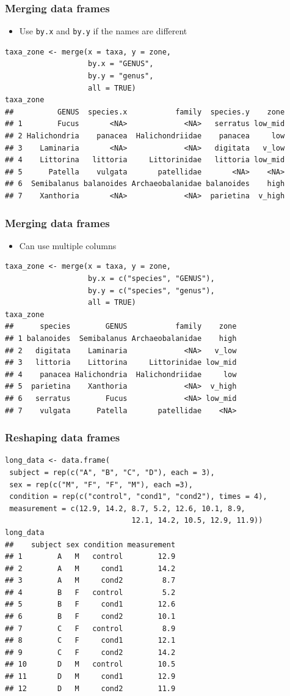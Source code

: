 \documentclass{beamer}
\newcommand{\lsting}[1]{\begin{lstlisting}[basicstyle=#1]}
\newcommand{\bi}{\begin{itemize}}
\newcommand{\li}{\item}
\newcommand{\ei}{\end{itemize}}
\newcommand{\bfr}[1]{\begin{frame}[fragile]\frametitle{{ #1 }}}
\begin{document}
\bfr{Merging data frames}
\bi
\li Use \verb|by.x| and \verb|by.y| if the names are different
\ei
\lsting{\tiny}
taxa_zone <- merge(x = taxa, y = zone, 
                   by.x = "GENUS", 
                   by.y = "genus",
                   all = TRUE)
taxa_zone
##          GENUS  species.x           family  species.y    zone
## 1        Fucus       <NA>             <NA>   serratus low_mid
## 2 Halichondria    panacea  Halichondriidae    panacea     low
## 3    Laminaria       <NA>             <NA>   digitata   v_low
## 4    Littorina   littoria     Littorinidae   littoria low_mid
## 5      Patella    vulgata       patellidae       <NA>    <NA>
## 6  Semibalanus balanoides Archaeobalanidae balanoides    high
## 7    Xanthoria       <NA>             <NA>  parietina  v_high
\end{lstlisting}

\end{frame}

\bfr{Merging data frames}
\bi
\li Can use multiple columns
\ei
\lsting{\tiny}
taxa_zone <- merge(x = taxa, y = zone, 
                   by.x = c("species", "GENUS"), 
                   by.y = c("species", "genus"), 
                   all = TRUE)
taxa_zone
##      species        GENUS           family    zone
## 1 balanoides  Semibalanus Archaeobalanidae    high
## 2   digitata    Laminaria             <NA>   v_low
## 3   littoria    Littorina     Littorinidae low_mid
## 4    panacea Halichondria  Halichondriidae     low
## 5  parietina    Xanthoria             <NA>  v_high
## 6   serratus        Fucus             <NA> low_mid
## 7    vulgata      Patella       patellidae    <NA>
\end{lstlisting}

\end{frame}

\bfr{Reshaping data frames}
\lsting{\scriptsize}
long_data <- data.frame(
 subject = rep(c("A", "B", "C", "D"), each = 3),
 sex = rep(c("M", "F", "F", "M"), each =3),
 condition = rep(c("control", "cond1", "cond2"), times = 4),
 measurement = c(12.9, 14.2, 8.7, 5.2, 12.6, 10.1, 8.9,
                             12.1, 14.2, 10.5, 12.9, 11.9))
long_data
##    subject sex condition measurement
## 1        A   M   control        12.9
## 2        A   M     cond1        14.2
## 3        A   M     cond2         8.7
## 4        B   F   control         5.2
## 5        B   F     cond1        12.6
## 6        B   F     cond2        10.1
## 7        C   F   control         8.9
## 8        C   F     cond1        12.1
## 9        C   F     cond2        14.2
## 10       D   M   control        10.5
## 11       D   M     cond1        12.9
## 12       D   M     cond2        11.9
\end{lstlisting}
\end{frame}
\end{document}

